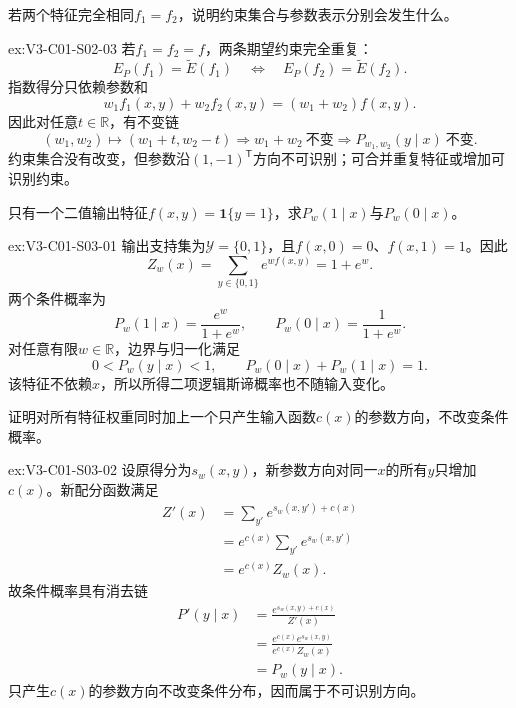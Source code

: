 \begin{SLChapterExercisePairSection}
\begin{exercise}\label{ex:V3-C01-S02-03}
若两个特征完全相同$f_1=f_2$，说明约束集合与参数表示分别会发生什么。
\end{exercise}
\ifSLFullEdition
{}\label{sol:V3-C01-S02-03}
\begin{chapterexercisesolution}{ex:V3-C01-S02-03}
若$f_1=f_2=f$，两条期望约束完全重复：
\[
E_{P}(f_1)=\widetilde E(f_1)
\quad\Longleftrightarrow\quad
E_{P}(f_2)=\widetilde E(f_2).
\]
指数得分只依赖参数和
\[
w_1f_1(x,y)+w_2f_2(x,y)
=(w_1+w_2)f(x,y).
\]
因此对任意$t\in\mathbb R$，有不变链
\[
(w_1,w_2)\mapsto(w_1+t,w_2-t)
\Longrightarrow w_1+w_2\ \text{不变}
\Longrightarrow P_{w_1,w_2}(y\mid x)\ \text{不变}.
\]
约束集合没有改变，但参数沿$(1,-1)^{\mathsf T}$方向不可识别；可合并重复特征或增加可识别约束。
\end{chapterexercisesolution}
\fi

\begin{exercise}\label{ex:V3-C01-S03-01}
只有一个二值输出特征$f(x,y)=\mathbf1\{y=1\}$，求$P_w(1\mid x)$与$P_w(0\mid x)$。
\end{exercise}
\ifSLFullEdition
{}\label{sol:V3-C01-S03-01}
\begin{chapterexercisesolution}{ex:V3-C01-S03-01}
输出支持集为$\mathcal Y=\{0,1\}$，且$f(x,0)=0$、$f(x,1)=1$。因此
\[
Z_w(x)=\sum_{y\in\{0,1\}}e^{wf(x,y)}=1+e^w.
\]
两个条件概率为
\[
P_w(1\mid x)=\frac{e^w}{1+e^w},
\qquad
P_w(0\mid x)=\frac{1}{1+e^w}.
\]
对任意有限$w\in\mathbb R$，边界与归一化满足
\[
0<P_w(y\mid x)<1,
\qquad
P_w(0\mid x)+P_w(1\mid x)=1.
\]
该特征不依赖$x$，所以所得二项逻辑斯谛概率也不随输入变化。
\end{chapterexercisesolution}
\fi

\begin{exercise}\label{ex:V3-C01-S03-02}
证明对所有特征权重同时加上一个只产生输入函数$c(x)$的参数方向，不改变条件概率。
\end{exercise}
\ifSLFullEdition
{}\label{sol:V3-C01-S03-02}
\begin{chapterexercisesolution}{ex:V3-C01-S03-02}
设原得分为$s_w(x,y)$，新参数方向对同一$x$的所有$y$只增加$c(x)$。新配分函数满足
\[
\begin{aligned}
Z'(x)
&=\sum_{y'}e^{s_w(x,y')+c(x)}\\
&=e^{c(x)}\sum_{y'}e^{s_w(x,y')}\\
&=e^{c(x)}Z_w(x).
\end{aligned}
\]
故条件概率具有消去链
\[
\begin{aligned}
P'(y\mid x)
&=\frac{e^{s_w(x,y)+c(x)}}{Z'(x)}\\
&=\frac{e^{c(x)}e^{s_w(x,y)}}{e^{c(x)}Z_w(x)}\\
&=P_w(y\mid x).
\end{aligned}
\]
只产生$c(x)$的参数方向不改变条件分布，因而属于不可识别方向。
\end{chapterexercisesolution}
\fi


\end{SLChapterExercisePairSection}
